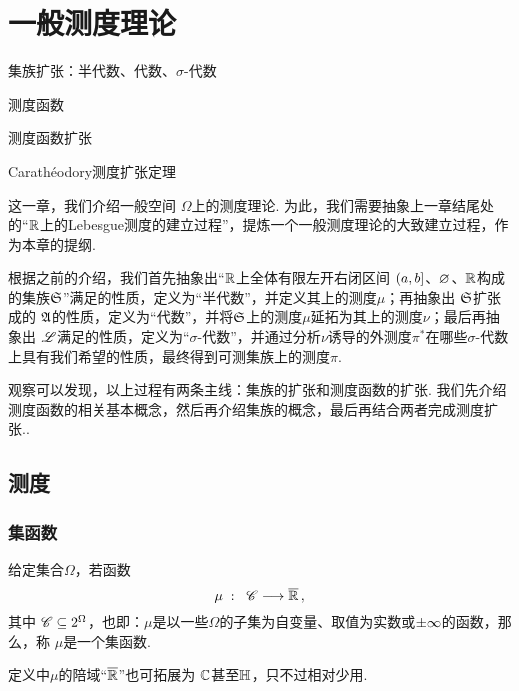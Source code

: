
\chapter{一般测度理论}\label{一般测度理论}

\begin{introduction}
    \item 集族扩张：半代数、代数、$\sigma$-代数
    \item 测度函数
    \item 测度函数扩张
    \item Carathéodory测度扩张定理
\end{introduction}
\vspace{0.5cm}

这一章，我们介绍一般空间 $\Omega$上的测度理论. 为此，我们需要抽象上一章结尾处的“$\mathbb{R}$上的Lebesgue测度的建立过程”，提炼一个一般测度理论的大致建立过程，作为本章的提纲.
\vspace{0.5cm}

根据之前的介绍，我们首先抽象出“$\mathbb{R}$上全体有限左开右闭区间 $\left(a,b\right]$、$\varnothing$、$\mathbb{R}$构成的集族${\mathfrak{S}}$”满足的性质，定义为“半代数”，并定义其上的测度$\mu$；再抽象出 ${\mathfrak{S}}$扩张成的 ${\mathfrak{A}}$的性质，定义为“代数”，并将${\mathfrak{S}}$上的测度$\mu$延拓为其上的测度$\nu$；最后再抽象出 $\mathscr{L}$满足的性质，定义为“$\sigma$-代数”，并通过分析$\nu$诱导的外测度$\pi^*$在哪些$\sigma$-代数上具有我们希望的性质，最终得到可测集族上的测度$\pi$.

观察可以发现，以上过程有两条主线：集族的扩张和测度函数的扩张. 我们先介绍测度函数的相关基本概念，然后再介绍集族的概念，最后再结合两者完成测度扩张..

\section{测度}

\subsection{集函数}

\begin{definition}[集函数]
    给定集合$\Omega$，若函数 
    \[  \mu\;:\;\; \mathscr{C} \longrightarrow \overline{\mathbb{R}}\,, \]
    其中 $\mathscr{C}\subseteq2^{\Omega}$，也即：$\mu$是以一些$\Omega$的子集为自变量、取值为实数或$\pm \infty$的函数，那么，称 $\mu$是一个集函数.
\end{definition}
\begin{remark}
    定义中$\mu$的陪域“$\overline{\mathbb{R}}$”也可拓展为 $\mathbb{C}$甚至$\mathbb{H}$，只不过相对少用.
\end{remark}

